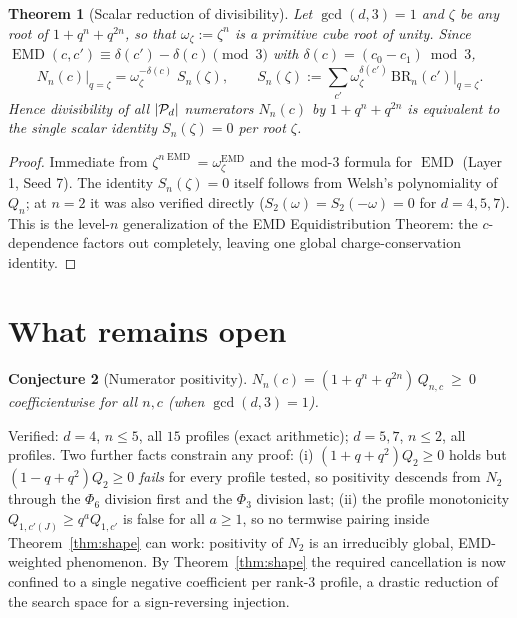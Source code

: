 \documentclass[11pt]{article}
\newtheorem{theorem}{Theorem}
\newtheorem{conjecture}[theorem]{Conjecture}
\newcommand{\EMD}{\operatorname{EMD}}
\begin{document}
\begin{theorem}[Scalar reduction of divisibility]\label{thm:scalar}
Let $\gcd(d,3)=1$ and $\zeta$ be any root of $1+q^n+q^{2n}$, so that
$\omega_\zeta:=\zeta^n$ is a primitive cube root of unity. Since
$\EMD(c,c')\equiv\delta(c')-\delta(c)\pmod 3$ with $\delta(c)=(c_0-c_1)\bmod3$,
\[
N_n(c)\big|_{q=\zeta}
=\omega_\zeta^{-\delta(c)}\;S_n(\zeta),\qquad
S_n(\zeta):=\sum_{c'}\omega_\zeta^{\delta(c')}\,\mathrm{BR}_n(c')\big|_{q=\zeta}.
\]
Hence divisibility of all $|{\cal P}_d|$ numerators $N_n(c)$ by $1+q^n+q^{2n}$
is equivalent to the single scalar identity $S_n(\zeta)=0$ per root $\zeta$.
\end{theorem}

\begin{proof}
Immediate from $\zeta^{n\EMD}=\omega_\zeta^{\EMD}$ and the mod-$3$ formula for
$\EMD$ (Layer 1, Seed 7). The identity $S_n(\zeta)=0$ itself follows from
Welsh's polynomiality of $Q_n$; at $n=2$ it was also verified directly
($S_2(\omega)=S_2(-\omega)=0$ for $d=4,5,7$). This is the level-$n$
generalization of the EMD Equidistribution Theorem: the $c$-dependence factors
out completely, leaving one global charge-conservation identity.
\end{proof}

\section{What remains open}

\begin{conjecture}[Numerator positivity]\label{con:num}
$N_n(c)=(1+q^n+q^{2n})\,Q_{n,c}\ \ge\ 0$ coefficientwise for all $n,c$
(when $\gcd(d,3)=1$).
\end{conjecture}

Verified: $d=4$, $n\le5$, all $15$ profiles (exact arithmetic);
$d=5,7$, $n\le2$, all profiles. Two further facts constrain any proof:
(i) $(1+q+q^2)Q_2\ge0$ holds but $(1-q+q^2)Q_2\ge0$ \emph{fails} for every
profile tested, so positivity descends from $N_2$ through the $\Phi_6$
division first and the $\Phi_3$ division last;
(ii) the profile monotonicity $Q_{1,c'(J)}\ge q^a Q_{1,c'}$ is false for all
$a\ge1$, so no termwise pairing inside Theorem~\ref{thm:shape} can work:
positivity of $N_2$ is an irreducibly global, EMD-weighted phenomenon.
By Theorem~\ref{thm:shape} the required cancellation is now confined to a
single negative coefficient per rank-$3$ profile, a drastic reduction of the
search space for a sign-reversing injection.
\end{document}
